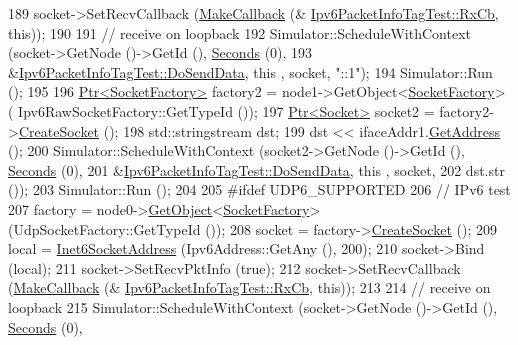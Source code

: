 \begin{DoxyCode}
189   socket->SetRecvCallback (\hyperlink{group__makecallbackmemptr_ga9376283685aa99d204048d6a4b7610a4}{MakeCallback} (&
      \hyperlink{classIpv6PacketInfoTagTest_a71bf0b1c87d70945d55fa28995a18db0}{Ipv6PacketInfoTagTest::RxCb}, \textcolor{keyword}{this}));
190 
191   \textcolor{comment}{// receive on loopback}
192   Simulator::ScheduleWithContext (socket->GetNode ()->GetId (), \hyperlink{group__timecivil_ga33c34b816f8ff6628e33d5c8e9713b9e}{Seconds} (0),
193                                   &\hyperlink{classIpv6PacketInfoTagTest_ab880bf3bb45b329560c08666ed9aa16d}{Ipv6PacketInfoTagTest::DoSendData}, \textcolor{keyword}{this}
      , socket, \textcolor{stringliteral}{"::1"});
194   Simulator::Run ();
195 
196   \hyperlink{classns3_1_1Ptr}{Ptr<SocketFactory>} factory2 = node1->GetObject<\hyperlink{classns3_1_1SocketFactory}{SocketFactory}> (
      Ipv6RawSocketFactory::GetTypeId ());
197   \hyperlink{classns3_1_1Ptr}{Ptr<Socket>} socket2 = factory2->\hyperlink{classns3_1_1SocketFactory_a97351e6e7860503a4912042530449f62}{CreateSocket} ();
198   std::stringstream dst;
199   dst << ifaceAddr1.\hyperlink{classns3_1_1Ipv6InterfaceAddress_a80d4caacff72bddc3045a5929519e107}{GetAddress} ();
200   Simulator::ScheduleWithContext (socket2->GetNode ()->GetId (), \hyperlink{group__timecivil_ga33c34b816f8ff6628e33d5c8e9713b9e}{Seconds} (0),
201                                   &\hyperlink{classIpv6PacketInfoTagTest_ab880bf3bb45b329560c08666ed9aa16d}{Ipv6PacketInfoTagTest::DoSendData}, \textcolor{keyword}{this}
      , socket,
202                                   dst.str ());
203   Simulator::Run ();
204 
205 \textcolor{preprocessor}{#ifdef UDP6\_SUPPORTED}
206   \textcolor{comment}{// IPv6 test}
207   factory = node0->\hyperlink{classns3_1_1Object_a13e18c00017096c8381eb651d5bd0783}{GetObject}<\hyperlink{classns3_1_1SocketFactory}{SocketFactory}> (UdpSocketFactory::GetTypeId ());
208   socket = factory->\hyperlink{classns3_1_1SocketFactory_a97351e6e7860503a4912042530449f62}{CreateSocket} ();
209   local =  \hyperlink{classns3_1_1Inet6SocketAddress}{Inet6SocketAddress} (Ipv6Address::GetAny (), 200);
210   socket->Bind (local);
211   socket->SetRecvPktInfo (\textcolor{keyword}{true});
212   socket->SetRecvCallback (\hyperlink{group__makecallbackmemptr_ga9376283685aa99d204048d6a4b7610a4}{MakeCallback} (&
      \hyperlink{classIpv6PacketInfoTagTest_a71bf0b1c87d70945d55fa28995a18db0}{Ipv6PacketInfoTagTest::RxCb}, \textcolor{keyword}{this}));
213 
214   \textcolor{comment}{// receive on loopback}
215   Simulator::ScheduleWithContext (socket->GetNode ()->GetId (), \hyperlink{group__timecivil_ga33c34b816f8ff6628e33d5c8e9713b9e}{Seconds} (0),

\end{DoxyCode}
